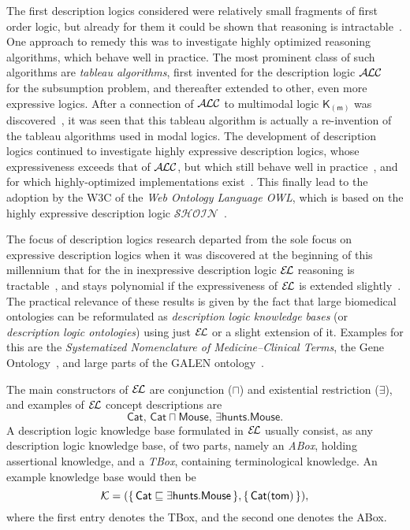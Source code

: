 The first description logics considered were relatively small fragments of first order
logic, but already for them it could be shown that reasoning is
intractable~\cite{conf/aaai/BrachmanL84,journals/ai/Nebel88}.  One approach to remedy this
was to investigate highly optimized reasoning algorithms, which behave well in practice.
The most prominent class of such algorithms are \emph{tableau algorithms}, first invented
for the description logic
$\mathcal{A}\kern-0.05em\mathcal{L}\mathcal{C}$~\cite{journals/ai/Schmidt-SchaussS91,conf/ecai/HollunderNS90} for the subsumption
problem, and thereafter extended to other, even more expressive logics.  After a
connection of $\mathcal{A}\kern-0.05em\mathcal{L}\mathcal{C}$ to multimodal logic $\mathsf{K}_{(\mathsf{m})}$ was
discovered~\cite{DBLP:conf/ijcai/Schild91}, it was seen that this tableau algorithm is
actually a re-invention of the tableau algorithms used in modal logics.  The development
of description logics continued to investigate highly expressive description logics, whose
expressiveness exceeds that of $\mathcal{A}\kern-0.05em\mathcal{L}\mathcal{C}$, but which still behave well in
practice~\cite{journals/igpl/HorrocksST00}, and for which highly-optimized implementations
exist~\cite{sirin_pellet:practical_2007,Haarslev:2001,DBLP:conf/cade/TsarkovH06}.  This
finally lead to the adoption by the W3C of the \emph{Web Ontology Language OWL}, which is
based on the highly expressive description logic
$\mathcal{S}\mathcal{H}\mathcal{O}\mathcal{I}\mathcal{N}$~\cite{horrocks03fromshiqrdftoowl}.

The focus of description logics research departed from the sole focus on expressive
description logics when it was discovered at the beginning of this millennium that for the
in inexpressive description logic ${\mathcal{E}\kern-.3ex\mathcal{L}}$ reasoning is
tractable~\cite{DBLP:conf/ijcai/Baader03a,DBLP:conf/ecai/Brandt04}, and stays polynomial
if the expressiveness of ${\mathcal{E}\kern-.3ex\mathcal{L}}$ is extended
slightly~\cite{DBLP:conf/ijcai/BaaderBL05,BaaderEtAl-OWLED08DC}.  The practical relevance
of these results is given by the fact that large biomedical ontologies can be reformulated
as \emph{description logic knowledge bases} (or \emph{description logic ontologies}) using
just ${\mathcal{E}\kern-.3ex\mathcal{L}}$ or a slight extension of it.  Examples for this are the \emph{Systematized
  Nomenclature of Medicine--Clinical Terms}, the Gene Ontology~\cite{gene-ontology}, and
large parts of the GALEN ontology~\cite{Rector199475}.

The main constructors of ${\mathcal{E}\kern-.3ex\mathcal{L}}$ are conjunction ($\sqcap$) and existential restriction
($\exists$), and examples of ${\mathcal{E}\kern-.3ex\mathcal{L}}$ concept descriptions are
\begin{equation*}
  \mathsf{Cat},\, \mathsf{Cat} \sqcap \mathsf{Mouse},\, \exists \mathsf{hunts}. \mathsf{Mouse}.
\end{equation*}
A description logic knowledge base formulated in ${\mathcal{E}\kern-.3ex\mathcal{L}}$ usually consist, as any description
logic knowledge base, of two parts, namely an \emph{ABox}, holding assertional knowledge,
and a \emph{TBox}, containing terminological knowledge.  An example knowledge base would
then be
\begin{equation*}
  \mathcal{K} = ({\{\, \mathsf{Cat} \sqsubseteq \exists \mathsf{hunts}. \mathsf{Mouse} \,\}},
  {\{\, \mathsf{Cat}(\mathsf{tom}) \,\}}),
\end{equation*}
where the first entry denotes the TBox, and the second one denotes the ABox.

